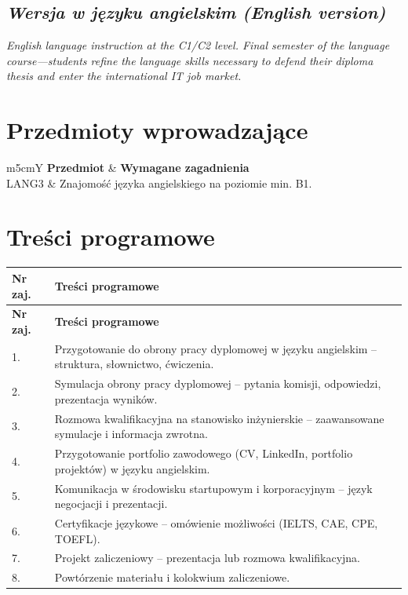 \documentclass[12pt, a4paper]{article}
\newcommand{\thdrule}{\noalign{\global\setlength{\extrarowheight}{0pt}}}
\newcommand{\thdend}{\noalign{\global\setlength{\extrarowheight}{3pt}}}
\begin{document}
\subsection*{\textit{Wersja w języku angielskim (English version)}}

\textit{English language instruction at the C1/C2 level. Final semester of the language course—students refine the language skills necessary to defend their diploma thesis and enter the international IT job market.}


\section{Przedmioty wprowadzające}

{\scriptsize
\begin{tabularx}{\textwidth}{m{5cm}Y}
\thdrule\toprule
{} {\color{white}\textbf{Przedmiot}} & {\color{white}\textbf{Wymagane zagadnienia}} \\
\midrule\thdend
   LANG3 & Znajomość języka angielskiego na poziomie min. B1. \\
\bottomrule
\end{tabularx}}

\section{Treści programowe}

{\scriptsize
\begin{longtable}{m{1.5cm}m{14.5cm}}
\thdrule\toprule
\rowcolor{pjatkRed} {\color{white}\textbf{Nr zaj.}} & {\color{white}\textbf{Treści programowe}} \\
\midrule\thdend
\endfirsthead
\thdrule\toprule
\rowcolor{pjatkRed} {\color{white}\textbf{Nr zaj.}} & {\color{white}\textbf{Treści programowe}} \\
\midrule\thdend
\endhead
  \rowcolor{tableRowLight} 1. & Przygotowanie do obrony pracy dyplomowej w języku angielskim – struktura, słownictwo, ćwiczenia. \\
  \rowcolor{tableRowAlt} 2. & Symulacja obrony pracy dyplomowej – pytania komisji, odpowiedzi, prezentacja wyników. \\
  \rowcolor{tableRowLight} 3. & Rozmowa kwalifikacyjna na stanowisko inżynierskie – zaawansowane symulacje i informacja zwrotna. \\
  \rowcolor{tableRowAlt} 4. & Przygotowanie portfolio zawodowego (CV, LinkedIn, portfolio projektów) w języku angielskim. \\
  \rowcolor{tableRowLight} 5. & Komunikacja w środowisku startupowym i korporacyjnym – język negocjacji i prezentacji. \\
  \rowcolor{tableRowAlt} 6. & Certyfikacje językowe – omówienie możliwości (IELTS, CAE, CPE, TOEFL). \\
  \rowcolor{tableRowLight} 7. & Projekt zaliczeniowy – prezentacja lub rozmowa kwalifikacyjna. \\
  \rowcolor{tableRowAlt} 8. & Powtórzenie materiału i kolokwium zaliczeniowe. \\
\bottomrule
\end{longtable}}
\end{document}
